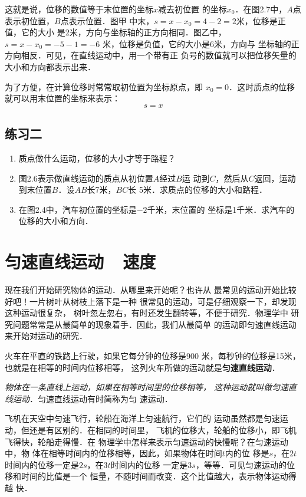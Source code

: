 这就是说，位移的数值等于末位置的坐标$x$减去初位置
的坐标$x_0$．在图2.7中，$A$点表示初位置，$B$点表示位置．图甲
中末，$s=x-x_0=4-2=2$米，位移是正值，它的大小
是2米，方向与坐标轴的正方向相同．图乙中，$s=x-x_0=-5-1=-6$
米，位移是负值，它的大小是6米，方向与
坐标轴的正方向相反．可见，在直线运动中，用一个带有正
负号的数值就可以把位移矢量的大小和方向都表示出来．

    为了方便，在计算位移时常常取初位置为坐标原点，即
$x_0=0$．这时质点的位移就可以用末位置的坐标来表示：
\[s=x\]

\subsection*{练习二}
\begin{enumerate}
  \item   质点做什么运动，位移的大小才等于路程？
  \item  图2.6表示做直线运动的质点从初位置$A$经过$B$运
  动到$C$，然后从$C$返回，运动到末位置$B$．设$AB$长7米，$BC$长
  5米．求质点的位移的大小和路程．
  \item 在图2.4中，汽车初位置的坐标是$-2$千米，末位置的
  坐标是1千米．求汽车的位移的大小和方向．
  
\end{enumerate}


\section{匀速直线运动~~速度}
    现在我们开始研究物体的运动．从哪里来开始呢？也许从
最常见的运动开始比较好吧！一片树叶从树枝上落下是一种
很常见的运动，可是仔细观察一下，却发现这种运动很复杂，
树叶忽左忽右，有时还发生翻转等，不便于研究．物理学中
研究问题常常是从最简单的现象着手．因此，我们从最简单
的运动即匀速直线运动来开始对运动的研究．

    火车在平直的铁路上行驶，如果它每分钟的位移是900
米，每秒钟的位移是15米，也就是在相等的时间内位移相等，
这列火车所做的运动就是\textbf{匀速直线运动}．

\textit{物体在一条直线上运动，如果在相等时间里的位移相等，
这种运动就叫做匀速直线运动}．匀速直线运动有时简称为匀
速运动．

    飞机在天空中匀速飞行，轮船在海洋上匀速航行，它们的
运动虽然都是匀速运动，但还是有区别的．在相同的时间里，
飞机的位移大，轮船的位移小，即飞机飞得快，轮船走得慢．在
物理学中怎样来表示匀速运动的快慢呢？在匀速运动中，物
体在相等时间内的位移相等，因此，如果物体在时间$t$内的位
移是$s$，在$2t$时间内的位移一定是$2s$，在$3t$时间内的位移
一定是$3s$，等等．可见匀速运动的位移和时间的比值是一个
恒量，不随时间而改变．这个比值越大，表示物体运动得越
快．

